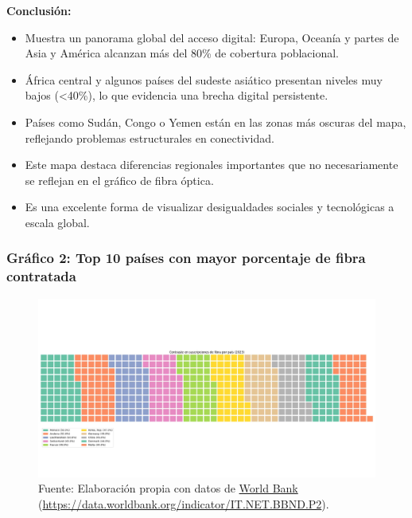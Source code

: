 \documentclass[12pt, a4paper]{article}
\begin{document}
\textbf{Conclusión:}
\begin{itemize}
    \item Muestra un panorama global del acceso digital: Europa, Oceanía y partes de Asia y América alcanzan más del 80\% de cobertura poblacional.
    \item África central y algunos países del sudeste asiático presentan niveles muy bajos (<40\%), lo que evidencia una brecha digital persistente.
    \item Países como Sudán, Congo o Yemen están en las zonas más oscuras del mapa, reflejando problemas estructurales en conectividad.
    \item Este mapa destaca diferencias regionales importantes que no necesariamente se reflejan en el gráfico de fibra óptica.
    \item Es una excelente forma de visualizar desigualdades sociales y tecnológicas a escala global.
\end{itemize}

\subsubsection*{Gráfico 2: Top 10 países con mayor porcentaje de fibra contratada}
\begin{figure}[H]
    \centering
    \includegraphics[width=1\textwidth]{images/Grafico_fibra_contratada_FC2.png}
    \caption[2]{Fuente: Elaboración propia con datos de \href{https://data.worldbank.org}{World Bank} 
    (\url{https://data.worldbank.org/indicator/IT.NET.BBND.P2}).}
\end{figure}
\end{document}
